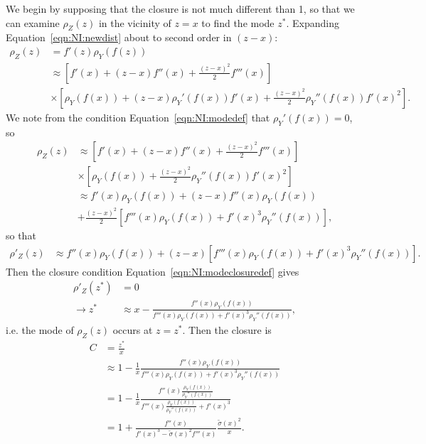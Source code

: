 We begin by supposing that the closure is not much different than 1, so that we can examine $\rho_Z(z)$ in the vicinity of $z=x$ to find the mode $z^*$. Expanding Equation~\ref{eqn:NI:newdist} about to second order in $(z-x)$:
\begin{align}
\rho_Z(z) &= f'(z)\rho_Y(f(z))\nonumber\\
&\approx \left[f'(x)+(z-x)f''(x)+\frac{(z-x)^2}{2}f'''(x)\right]\nonumber\\
&\times\left[\rho_Y(f(x))+(z-x)\rho_Y'(f(x))f'(x)+\frac{(z-x)^2}{2}\rho_Y''(f(x))f'(x)^2\right].
\end{align}
We note from the condition Equation~\ref{eqn:NI:modedef} that $\rho_Y'(f(x))=0$, so
\begin{align}
\rho_Z(z)&\approx \left[f'(x)+(z-x)f''(x)+\frac{(z-x)^2}{2}f'''(x)\right]\nonumber\\
&\times\left[\rho_Y(f(x))+\frac{(z-x)^2}{2}\rho_Y''(f(x))f'(x)^2\right]\nonumber\\
&\approx f'(x)\rho_Y(f(x))+(z-x)f''(x)\rho_Y(f(x))\nonumber\\
&+\frac{(z-x)^2}{2}\left[f'''(x)\rho_Y(f(x))+f'(x)^3\rho_Y''(f(x))\right],
\end{align}
so that
\begin{align}
\rho'_Z(z)&\approx f''(x)\rho_Y(f(x))+(z-x)\left[f'''(x)\rho_Y(f(x))+f'(x)^3\rho_Y''(f(x))\right].
\label{eqn:NI:drhoz}
\end{align}
Then the closure condition Equation~\ref{eqn:NI:modeclosuredef} gives
\begin{align}
\rho'_Z(z^*)&=0\nonumber\\
\rightarrow z^* &\approx x-\frac{f''(x)\rho_Y(f(x))}{f'''(x)\rho_Y(f(x))+f'(x)^3\rho_Y''(f(x))},
\end{align}
i.e. the mode of $\rho_Z(z)$ occurs at $z=z^*$.  Then the closure is
\begin{align}
C &= \frac{z^*}{x}\nonumber\\
&\approx 1-\frac{1}{x}\frac{f''(x)\rho_Y(f(x))}{f'''(x)\rho_Y(f(x))+f'(x)^3\rho_Y''(f(x))}\nonumber\\
&=1-\frac{1}{x}\frac{f''(x)\frac{\rho_Y(f(x))}{\rho_Y''(f(x))}}{f'''(x)\frac{\rho_Y(f(x))}{\rho_Y''(f(x))}+f'(x)^3}\nonumber\\
&=1+\frac{f''(x)}{f'(x)^3-\tilde{\sigma}(x)^2f'''(x)}\frac{\tilde{\sigma}(x)^2}{x}.
\label{eqn:NI:mode_closure_df3}
\end{align}

